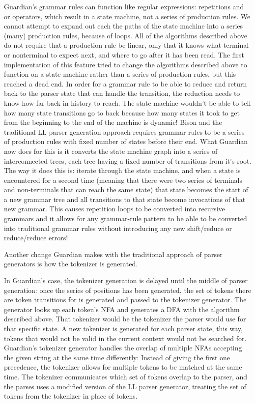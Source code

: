 {{		Guardian's grammar rules can function like regular expressions: repetitions
		and or operators, which result in a state machine, not a series
		of production rules. We cannot attempt to expand out each the paths
		of the state machine into a series (many) production rules, because
		of loops. All of the algorithms described above do not require
		that a production rule be linear, only that it knows what terminal or
		nonterminal to expect next, and where to go after it has been read.
		The first implementation of this feature tried to change the algorithms
		described above to function on a state machine rather than a series
		of production rules, but this reached a dead end. In order for a
		grammar rule to be able to reduce and return back to the parser
		state that can handle the transition, the reduction needs to know
		how far back in history to reach. The state machine wouldn't be able
		to tell how many state transitions go to back because how many states
		it took to get from the beginning to the end of the machine is dynamic!
		Bison and the traditional LL parser generation approach requires
		grammar rules to be a series of production rules with fixed number
		of states before their end.
		What Guardian now does for this is it converts the state machine
		graph into a series of interconnected trees, each tree having a fixed
		number of transitions from it's root.
		The way it does this is: iterate through the state machine, and when
		a state is encountered for a second time (meaning that there were two
		series of terminals and non-terminals that can reach the same state)
		that state becomes the start of a new grammar tree and all transitions
		to that state become invocations of that new grammar.
		This causes repetition loops to be converted into recursive grammars
		and it allows for any grammar-rule pattern to be able to be converted
		into traditional grammar rules without introducing any new shift/reduce
		or reduce/reduce errors!

		Another change Guardian makes with the traditional approach of parser
		generators is how the tokenizer is generated.

		In Guardian's case, the tokenizer generation is delayed until
		the middle of parser generation: once the series of positions has been
		generated, the set of tokens there are token transitions for is
		generated and passed to the tokenizer generator. The generator
		looks up each token's NFA and generates a DFA with the algorithm
		described above. That tokenizer would be the tokenizer the parser
		would use for that specific state. A new tokenizer is generated
		for each parser state, this way, tokens that would not be valid in
		the current context would not be searched for.
		Guardian's tokenizer generator handles the overlap of
		multiple NFAs accepting
		the given string at the same time differently: Instead of giving the
		first one precedence, the tokenizer allows for multiple tokens to be matched
		at the same time. The tokenizer communicates which set of tokens overlap
		to the parser, and the parses uses a modified version of
		the LL parser generator, treating the set of tokens from the tokenizer
		in place of tokens.

}}
